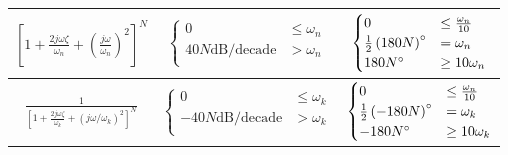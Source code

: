 \documentclass[10pt,letterpaper,final,twoside,notitlepage]{article}
\begin{document}
\begin{table}[!h]
\begin{tabular}{|c|c|c|}
				$\left[ 1 + \frac{2 j \omega \zeta}{\omega_{n}} + \left( \frac{j \omega}{\omega_{n}} \right)^{2} \right]^{N}$ & $\begin{cases}
					0 & \leq \omega_{n} \\
					40N \text{dB/decade} & > \omega_{n} \\
				\end{cases}$
				&
				$\begin{cases}
					0 & \leq \frac{\omega_{n}}{10} \\
					\frac{1}{2} \left( 180 N \right) \degree & = \omega_{n} \\
					180N \degree & \geq 10 \omega_{n} \\
				\end{cases}$
				\\ \hline
				
				$\frac{1}{\left[ 1 + \frac{2 j \omega \zeta}{\omega_{k}} + \left( j \omega / \omega_{k} \right)^{2} \right]^{N}}$ & $\begin{cases}
					0 & \leq \omega_{k} \\
					-40N \text{dB/decade} & > \omega_{k} \\
				\end{cases}$
				&
				$\begin{cases}
					0 & \leq \frac{\omega_{n}}{10} \\
					\frac{1}{2} \left( -180 N \right) \degree & = \omega_{k} \\
					-180N \degree & \geq 10 \omega_{k} \\	
				\end{cases}$
				\\ \hline
		\end{tabular}
	\end{table}
\end{document}
